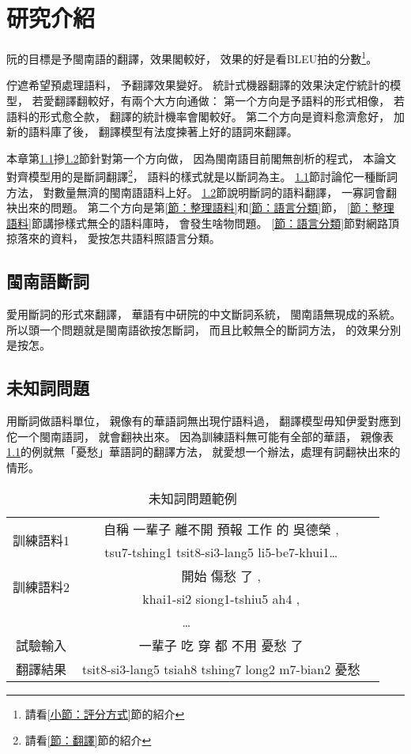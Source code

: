 \chapter{研究介紹}
\label{章：研究介紹}

阮的目標是予閩南語的翻譯，效果閣較好，
效果的好是看BLEU拍的分數\footnote{請看\ref{小節：評分方式}節的紹介}。

佇遮希望預處理語料，
予翻譯效果變好。
統計式機器翻譯的效果決定佇統計的模型，
若愛翻譯翻較好，有兩个大方向通做：
第一个方向是予語料的形式相像，
若語料的形式愈仝款，
翻譯的統計機率會閣較好。
第二个方向是資料愈濟愈好，
加新的語料庫了後，
翻譯模型有法度揀著上好的語詞來翻譯。

本章第\ref{節：閩南語斷詞}摻\ref{節：未知詞問題}節針對第一个方向做，
因為閩南語目前閣無剖析的程式，
本論文對齊模型用的是斷詞翻譯\footnote{請看\ref{節：翻譯}節的紹介}，
語料的樣式就是以斷詞為主。
\ref{節：閩南語斷詞}節討論佗一種斷詞方法，
對數量無濟的閩南語語料上好。
\ref{節：未知詞問題}節說明斷詞的語料翻譯，
一寡詞會翻袂出來的問題。
第二个方向是第\ref{節：整理語料}和\ref{節：語言分類}節，
\ref{節：整理語料}節講摻樣式無仝的語料庫時，
會發生啥物問題。
\ref{節：語言分類}節對網路頂掠落來的資料，
愛按怎共語料照語言分類。

\section{閩南語斷詞}
\label{節：閩南語斷詞}
愛用斷詞的形式來翻譯，
華語有中研院的中文斷詞系統，
閩南語無現成的系統。
所以頭一个問題就是閩南語欲按怎斷詞，
而且比較無仝的斷詞方法，
的效果分別是按怎。

\section{未知詞問題}
\label{節：未知詞問題}
用斷詞做語料單位，
親像有的華語詞無出現佇語料過，
翻譯模型毋知伊愛對應到佗一个閩南語詞，
就會翻袂出來。
因為訓練語料無可能有全部的華語，
親像表\ref{表：未知詞問題範例}的例就無「憂愁」華語詞的翻譯方法，
就愛想一个辦法，處理有詞翻袂出來的情形。


\begin{table}
\caption{未知詞問題範例}
\label{表：未知詞問題範例}
\centering
\begin{tabular}{ccc}
\hline
\multirow{2}{*}{訓練語料1} & 自稱 一輩子 離不開 預報 工作 的 吳德榮 , \\
 & tsu7-tshing1 tsit8-si3-lang5 li5-be7-khui1… \\
\hline
\multirow{2}{*}{訓練語料2} & 開始 傷愁 了 , \\
 & khai1-si2 siong1-tshiu5 ah4 , \\
\hline
\multicolumn{2}{c}{…} \\
\hline
\hline
試驗輸入 & 一輩子 吃 穿 都 不用 憂愁 了 \\
翻譯結果 & tsit8-si3-lang5 tsiah8 tshing7 long2 m7-bian2 憂愁 \\
\hline
\end{tabular}
\end{table}

